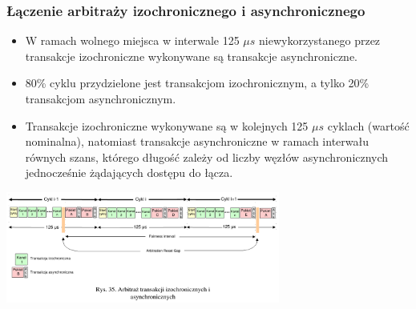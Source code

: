 \subsubsection{Łączenie arbitraży izochronicznego i asynchronicznego}
\begin{itemize}
	\item W ramach wolnego miejsca w interwale 125 $\mu{s}$ niewykorzystanego przez transakcje izochroniczne wykonywane są transakcje asynchroniczne.
	\item 80\% cyklu przydzielone jest transakcjom izochronicznym, a tylko 20\% transakcjom asynchronicznym.
	\item Transakcje izochroniczne wykonywane są w kolejnych 125 $\mu{s}$ cyklach (wartość nominalna), natomiast transakcje asynchroniczne w ramach interwału równych szans, którego długość zależy od liczby węzłów asynchronicznych jednocześnie żądających dostępu do łącza.
\end{itemize}
\includegraphics[width=9cm]{./wyklady/FIREWIRE_45_1.pdf}\\

